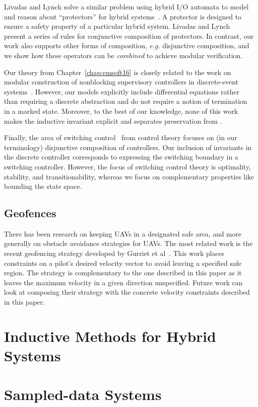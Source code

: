 Livadas and Lynch solve a similar problem using hybrid I/O automata to
model and reason about ``protectors'' for hybrid systems~\cite{LivadasL98}.
A protector is designed to ensure a safety property of a particular hybrid
system. Livadas and Lynch present a series of rules for conjunctive
composition of protectors.  In contrast, our work also supports other forms
of composition, \textit{e.g.} disjunctive composition, and we show how
these operators can be \emph{combined} to achieve modular verification.

Our theory from Chapter~\ref{chap:emsoft16} is closely related to the work
on modular construction of nonblocking supervisory controllers in
discrete-event systems~\cite{wonham1988supervisory}.  However, our
models explicitly include differential equations rather than requiring a
discrete abstraction and do not require a notion of termination in a marked
state.  Moreover, to the best of our knowledge, none of this work makes the
inductive invariant explicit and separates preservation from \progress{}.

Finally, the area of switching control~\cite{liberzon2012switching} from
control theory focuses on (in our terminology) disjunctive composition of
controllers.  Our inclusion of invariants in the discrete controller
corresponds to expressing the switching boundary in a switching controller.
However, the focus of switching control theory is optimality, stability,
and transitionability, whereas we focus on complementary properties like
bounding the state space.

\subsection{Geofences}
There has been research on keeping UAVs in a designated safe area, and more
generally on obstacle avoidance strategies for UAVs. The most related work
is the recent geofencing strategy developed by Gurriet et
al~\cite{gurriet16geofence}. This work places constraints on a pilot's
desired velocity vector to avoid leaving a specified safe region. The
strategy is complementary to the one described in this paper as it leaves
the maximum velocity in a given direction unspecified. Future work can look
at composing their strategy with the concrete velocity constraints
described in this paper.

\section{Inductive Methods for Hybrid Systems}

\section{Sampled-data Systems}
